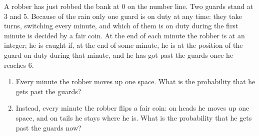 A robber has just robbed the bank at $0$ on the number line. Two guards stand at $3$ and $5$. Because of the rain only one guard is on duty at any time: they take turns, switching every minute, and which of them is on duty during the first minute is decided by a fair coin. At the end of each minute the robber is at an integer; he is caught if, at the end of some minute, he is at the position of the guard on duty during that minute, and he has got past the guards once he reaches $6$.
\begin{enumerate}
\item[(a)] Every minute the robber moves up one space. What is the probability that he gets past the guards?
\item[(b)] Instead, every minute the robber flips a fair coin: on heads he moves up one space, and on tails he stays where he is. What is the probability that he gets past the guards now?
\end{enumerate}
